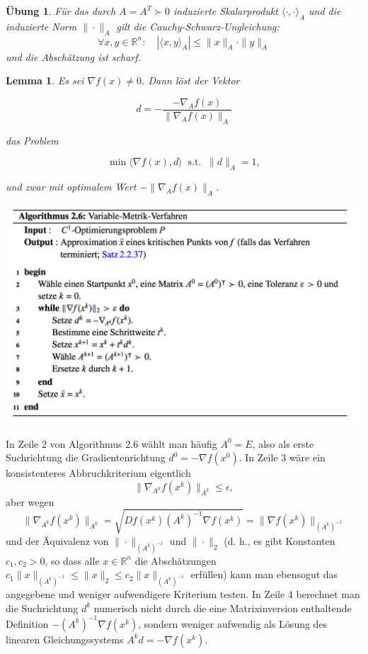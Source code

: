 \documentclass[11pt]{scrreprt}
\newcounter{thm}
\theoremstyle{thmstyle}
\numberwithin{thm}{section}
\newtheorem{lemma}[thm]{Lemma}
\newtheorem{uebung}[thm]{Übung}
\begin{document}
\begin{uebung}
	Für das durch $A = A^T \succ 0$ induzierte Skalarprodukt $\langle \cdot, \cdot \rangle_A$ und die induzierte Norm $\| \cdot \|_A$ gilt die Cauchy-Schwarz-Ungleichung:
		$$ \forall x,y \in \mathbb{R}^n: \quad \left| \langle x, y \rangle_A \right| \leq \| x \|_A \cdot \| y \|_A $$
	und die Abschätzung ist scharf.
\end{uebung}

\begin{lemma}
	Es sei $\nabla f(x) \neq 0$. Dann löst der Vektor
	 
		$$ d = - \frac{- \nabla_A f(x)}{\| \nabla_A f(x) \|_A} $$
		
	das Problem 
	
		$$ \min \langle \nabla f(x), d \rangle ~\text{ s.t. }~ \| d \|_A = 1, $$
	
	und zwar mit optimalem Wert $- \| \nabla_A f(x) \|_A$.
\end{lemma}

\begin{center}
	\includegraphics[scale=0.5]{img/a26}
\end{center}

In Zeile 2 von Algorithmus 2.6 wählt man häufig $A^0 = E$, also als erste Suchrichtung die Gradientenrichtung $d^0 = - \nabla f(x^0)$. In Zeile 3 wäre ein konsistenteres Abbruchkriterium eigentlich 
		$$ \| \nabla_{A^{k}} f(x^k) \|_{A^k} \leq \epsilon, $$
	aber wegen
		$$ \| \nabla_{A^{k}} f(x^k) \|_{A^k} = \sqrt{D f(x^k) (A^k)^{-1} \nabla f(x^k)} = \| \nabla f(x^k) \|_{(A^k)^{-1}} $$
	und der Äquivalenz von $\| \cdot \|_{(A^{k})^{-1}}$ und $\| \cdot \|_2$ (d. h., es gibt Konstanten $c_1, c_2 > 0$, so dass alle $x \in \mathbb{R}^n$ die Abschätzungen $c_1 \| x \|_{(A^{k})^{-1}}\leq \| x \|_2 \leq c_2 \| x \|_{(A^k)^{-1}}$ erfüllen) kann man ebensogut das angegebene und weniger aufwendigere Kriterium testen. In Zeile 4 berechnet man die Suchrichtung $d^k$ numerisch nicht durch die eine Matrixinversion enthaltende Definition $-(A^k)^{-1} \nabla f(x^k)$, sondern weniger aufwendig als Lösung des linearen Gleichungssystems $A^k d = - \nabla f(x^k)$. ~\bigskip
\end{document}
